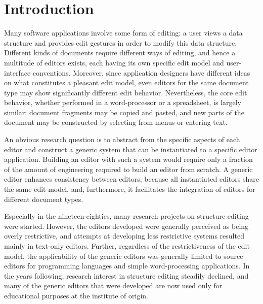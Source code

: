 \chapter{Introduction} \label{chap:introduction}



Many software applications involve some form of editing: a user views a data structure and provides edit gestures in order to modify this data structure. Different kinds of documents require different ways of editing, and hence a multitude of editors exists, each having its own specific edit model and user-interface conventions. Moreover,  since application designers have different ideas on what constitutes a pleasant edit model, even editors for the same document type may show significantly different edit behavior. Nevertheless, the core edit behavior, whether performed in a word-processor or a spreadsheet, is largely similar: document fragments may be copied and pasted, and new parts of the document may be constructed by selecting from menus or entering text. 


An obvious research question is to abstract from the specific aspects of each editor and construct a generic system that can be instantiated to a specific editor application. Building an editor with such a system would require only a fraction of the amount of engineering required to build an editor from scratch. 
A generic editor enhances consistency between editors, because all instantiated editors share the same edit model, and, furthermore, it facilitates the integration of editors for different document types.




Especially in the nineteen-eighties, many research projects on structure editing were started. However, the editors developed were generally perceived as being overly restrictive, and attempts at developing less restrictive systems resulted mainly in text-only editors.  Further, regardless of the restrictiveness of the edit model, the applicability of the generic editors was generally limited to source editors for programming languages and simple word-processing applications.
In the years following, research interest in structure editing steadily declined, and many of the generic editors that were developed are now used only for educational purposes at the institute of origin.

